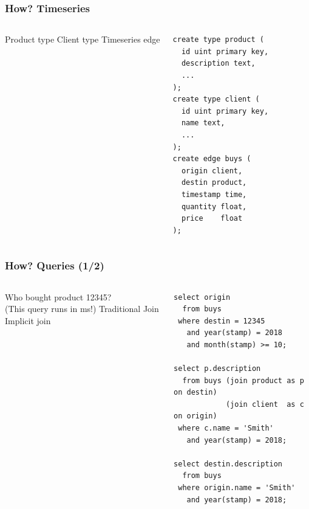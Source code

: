 \documentclass[mathserif,usenames,dvipsnames]{beamer}
\begin{document}
\begin{frame}[fragile]
\frametitle{How? Timeseries}
\begin{columns}[T]
\vskip0.5cm
{\small Product type}
\vskip1.7cm
{\small Client type}
\vskip1.7cm
{\small Timeseries edge}
\begin{sqlcode}
\begin{lstlisting}
create type product (
  id uint primary key,
  description text,
  ...
);
create type client (
  id uint primary key,
  name text,
  ...
);
create edge buys (
  origin client,
  destin product,
  timestamp time,
  quantity float,
  price    float
);
\end{lstlisting}
\end{sqlcode}
\end{columns}
\end{frame}

\begin{frame}[fragile]
\frametitle{How? Queries (1/2)}
\begin{columns}[T]
\vskip0.5cm
{\small Who bought product 12345?}\\
{\tiny  (This query runs in ms!)}
\vskip1.0cm
{\small Traditional Join}
\vskip1.9cm
{\small Implicit join}
\begin{sqlcode}
\begin{lstlisting}
select origin
  from buys
 where destin = 12345
   and year(stamp) = 2018
   and month(stamp) >= 10;

select p.description
  from buys (join product as p on destin)
            (join client  as c on origin)
 where c.name = 'Smith'
   and year(stamp) = 2018;

select destin.description
  from buys
 where origin.name = 'Smith'
   and year(stamp) = 2018;
\end{lstlisting}
\end{sqlcode}
\end{columns}
\end{frame}
\end{document}
